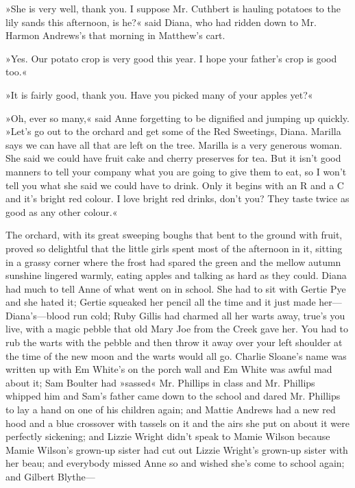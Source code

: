 »She is very well, thank you. I suppose Mr. Cuthbert is hauling potatoes to the lily sands this afternoon, is he?« said Diana, who had ridden down to Mr. Harmon Andrews’s that morning in Matthew’s cart.

»Yes. Our potato crop is very good this year. I hope your father’s crop is good too.«

»It is fairly good, thank you. Have you picked many of your apples yet?«

»Oh, ever so many,« said Anne forgetting to be dignified and jumping up quickly. »Let’s go out to the orchard and get some of the Red Sweetings, Diana. Marilla says we can have all that are left on the tree. Marilla is a very generous woman. She said we could have fruit cake and cherry preserves for tea. But it isn’t good manners to tell your company what you are going to give them to eat, so I won’t tell you what she said we could have to drink. Only it begins with an R and a C and it’s bright red colour. I love bright red drinks, don’t you? They taste twice as good as any other colour.«

The orchard, with its great sweeping boughs that bent to the ground with fruit, proved so delightful that the little girls spent most of the afternoon in it, sitting in a grassy corner where the frost had spared the green and the mellow autumn sunshine lingered warmly, eating apples and talking as hard as they could. Diana had much to tell Anne of what went on in school. She had to sit with Gertie Pye and she hated it; Gertie squeaked her pencil all the time and it just made her—Diana’s—blood run cold; Ruby Gillis had charmed all her warts away, true’s you live, with a magic pebble that old Mary Joe from the Creek gave her. You had to rub the warts with the pebble and then throw it away over your left shoulder at the time of the new moon and the warts would all go. Charlie Sloane’s name was written up with Em White’s on the porch wall and Em White was awful mad about it; Sam Boulter had »sassed« Mr. Phillips in class and Mr. Phillips whipped him and Sam’s father came down to the school and dared Mr. Phillips to lay a hand on one of his children again; and Mattie Andrews had a new red hood and a blue crossover with tassels on it and the airs she put on about it were perfectly sickening; and Lizzie Wright didn’t speak to Mamie Wilson because Mamie Wilson’s grown-up sister had cut out Lizzie Wright’s grown-up sister with her beau; and everybody missed Anne so and wished she’s come to school again; and Gilbert Blythe—

